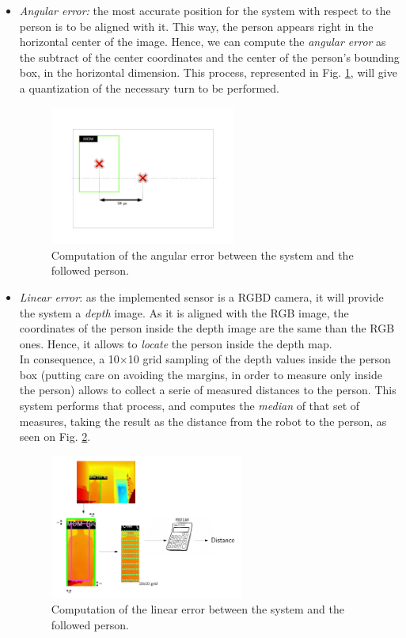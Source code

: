 \begin{itemize}
	\item \emph{Angular error:} the most accurate position for the system with respect to the person is to be aligned with it. This way, the person appears right in the horizontal center of the image. Hence, we can compute the \emph{angular error} as the subtract of the center coordinates and the center of the person's bounding box, in the horizontal dimension. This process,  represented in Fig. \ref{fig:h_error}, will give a quantization of the necessary turn to be performed.\\
	
	\begin{figure}
		\centering
		\includegraphics[width=2.4in]{images/h_error}
		\caption{Computation of the angular error between the system and the followed person.}
		\label{fig:h_error}
	\end{figure}
	
	
	\item \emph{Linear error}: as the implemented sensor is a RGBD camera, it will provide the system a \emph{depth} image. As it is aligned with the RGB image, the coordinates of the person inside the depth image are the same than the RGB ones. Hence, it allows to \emph{locate} the person inside the depth map.\\
	
	In consequence, a 10$\times$10 grid sampling of the depth values inside the person box (putting care on avoiding the margins, in order to measure only inside the person) allows to collect a serie of measured distances to the person. This system performs that process, and computes the \emph{median} of that set of measures, taking the result as the distance from the robot to the person, as seen on Fig. \ref{fig:v_error}.
	
	
	\begin{figure}[h]
		\centering
		\includegraphics[width=2.5in]{images/distance_error}
		\caption{Computation of the linear error between the system and the followed person.}
		\label{fig:v_error}
	\end{figure}
	
\end{itemize}


